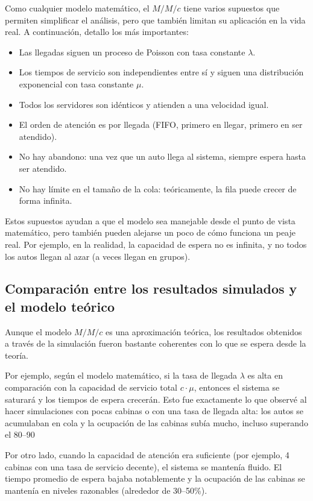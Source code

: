 \documentclass[12pt]{article}
\begin{document}
Como cualquier modelo matemático, el $M/M/c$ tiene varios supuestos que permiten simplificar el análisis, pero que también limitan su aplicación en la vida real. A continuación, detallo los más importantes:

\begin{itemize}
  \item Las llegadas siguen un proceso de Poisson con tasa constante $\lambda$.
  \item Los tiempos de servicio son independientes entre sí y siguen una distribución exponencial con tasa constante $\mu$.
  \item Todos los servidores son idénticos y atienden a una velocidad igual.
  \item El orden de atención es por llegada (FIFO, primero en llegar, primero en ser atendido).
  \item No hay abandono: una vez que un auto llega al sistema, siempre espera hasta ser atendido.
  \item No hay límite en el tamaño de la cola: teóricamente, la fila puede crecer de forma infinita.
\end{itemize}

Estos supuestos ayudan a que el modelo sea manejable desde el punto de vista matemático, pero también pueden alejarse un poco de cómo funciona un peaje real. Por ejemplo, en la realidad, la capacidad de espera no es infinita, y no todos los autos llegan al azar (a veces llegan en grupos).

\subsection*{Comparación entre los resultados simulados y el modelo teórico}

Aunque el modelo $M/M/c$ es una aproximación teórica, los resultados obtenidos a través de la simulación fueron bastante coherentes con lo que se espera desde la teoría.

Por ejemplo, según el modelo matemático, si la tasa de llegada $\lambda$ es alta en comparación con la capacidad de servicio total $c \cdot \mu$, entonces el sistema se saturará y los tiempos de espera crecerán. Esto fue exactamente lo que observé al hacer simulaciones con pocas cabinas o con una tasa de llegada alta: los autos se acumulaban en cola y la ocupación de las cabinas subía mucho, incluso superando el 80–90%

Por otro lado, cuando la capacidad de atención era suficiente (por ejemplo, 4 cabinas con una tasa de servicio decente), el sistema se mantenía fluido. El tiempo promedio de espera bajaba notablemente y la ocupación de las cabinas se mantenía en niveles razonables (alrededor de 30–50\%).
\end{document}
